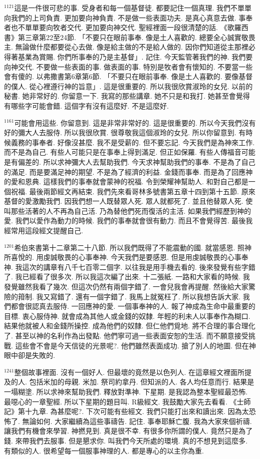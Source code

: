 \documentclass{book}
\begin{document}
$^{1121}$這是一件很可悲的事.
受身者和每一個基督徒.
都要記住一個真理.
我們不單單向我們的上司負責.
更加要向神負責.
不是做一些表面功夫.
是真心真意去做.
事奉者也不單單要向牧者交代.
更加要向神交代.
聖經裡面一段很清楚的話.
《歌羅西書》第三章第22至24節.
「不要只在眼前事奉.
像是土人喜歡的.
總要全心誠實敬畏主.
無論做什麼都要從心去做.
像是給主做的不是給人做的.
因你們知道從主那裡必得著基業為賞賜.
你們所事奉的乃是主基督」.
記住.
今天監管著我們的神.
我們要向神交代.
不要做一些表面的事.
做表面的事.
特別是牧者會有懷知的.
不要當一些會有傻的.
以弗撒書第6章第6節.
「不要只在眼前事奉.
像是土人喜歡的.
要像基督的僕人.
從心裡遵行神的旨意」.
這是很重要的.
所以我很欣賞淑玲的女兒.
以前的秘書.
她非常好的.
你留意一下.
我寫的那些講章.
她不只是和我打.
她甚至會覺得有哪些字可能會錯.
這個字有沒有這麼好.
不是這麼好.

$^{1161}$可能會用這些.
你留意到.
這是非常非常好的.
這是很重要的.
所以今天我們沒有好的彌大人去服侍.
所以我很欣賞.
很尊敬我這個淑玲的女兒.
所以你留意到.
有時候義務的事奉者.
好像沒甚麼.
我不是受薪的.
但不要忘記.
今天我們是為神來工作.
而不是為自己.
有些人可能只是在事奉上得到滿足.
但正如保羅.
有些人傳福音可能是有偏差的.
所以求神彌大人去幫助我們.
今天求神幫助我們的事奉.
不是為了自己的滿足.
而是要滿足神的期望.
不是為了經濟的利益.
金錢而事奉.
而是為了回應神的愛和恩典.
這樣我們的事奉就會蒙神的祝福.
令到榮耀神幫助人.
和對自己都是一個祝福.
最後兩節經文再結束.
我們先來看哥林多號書第五章十四到第十五節.
原來基督的愛激勵我們.
因我們想一人既替眾人死.
眾人就都死了.
並且他替眾人死.
使叫那些活著的人不再為自己活.
乃為替他們死而復活的主活.
如果我們經歷到神的愛.
我們以愛作為動力的時候.
我們的事奉就會很有動力.
而且不會覺得苦.
最後我經常用這段經文提醒自己.

$^{1201}$希伯來書第十二章第二十八節.
所以我們既得了不能震動的國.
就當感恩.
照神所喜悅的.
用虔誠敬畏的心事奉神.
今天我們是要感恩.
但是用虔誠敬畏的心事奉神.
我這次的講章有八千七百零二個字.
以往我是用手機去看的.
後來發覺有些字錯了.
我已經看了很多次.
所以我這次編了出來.
十二張紙.
一路和大家看的時候.
我發覺雖然我看了幾次.
但這次仍然有兩個字錯了.
一會兒我會再提醒.
然後給大家驚險的箝制.
我又寫錯了.
還有一個字錯了.
我馬上就冤枉了.
所以我想告訴大家.
我們都會很認真去服侍.
一回應神的愛.
一個事奉神的人.
報了神成為生命中最重要的目標.
衷心服侍神.
就會成為其他人或金錢的奴隸.
年輕的利未人以事奉作為糊口.
結果他就被人和金錢所操控.
成為他們的奴隸.
但仁他們覓地.
將不合理的事合理化了.
甚至以神的名利作為出發點.
他們寧可過一些表面安恕的生活.
而不願意接受挑戰.
這些會不會是今天信徒的光景呢?.
他們雖然表面成功.
搶了別人的地圖.
但在神眼中卻是失敗的.

$^{1241}$整個故事裡面.
沒有一個好人.
但最壞的竟然是以色列人.
在這章經文裡面所提及的人.
包括米加的母親.
米加.
祭司約拿丹.
但知派的人.
各人均任意而行.
結果是一塌糊塗.
所以求神來幫助我們.
釋放對準神.
下星期.
是我認為整本聖經最恐怖.
最噁心的一章聖經.
所以下星期的題目叫.
R級經文.
我鼓勵大家先去看看.
《士師記》第十九章.
為甚麼呢?.
下次可能有些經文.
我們只能打出來和讀出來.
因為太恐怖了.
無論如何.
大家繼續為這些事禱告.
記住.
事奉耶穌亡腹.
我為大家來個祈禱.
讓我們有機會來學習.
神撚見到.
真是很不幸.
有很多你所謂的僕人.
竟然只是為了錢.
來帶我們去服事.
但是懇求你.
叫我們今天所處的環境.
真的不想見到這麼多.
有類似的人.
很希望每一個服事神理的人.
都是專心的以主你為重.
\end{document}
